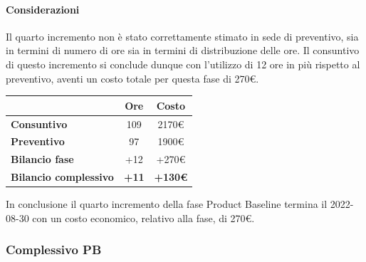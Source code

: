 \paragraph{Considerazioni} \hfill \break
Il quarto incremento non è stato correttamente stimato in sede di preventivo, sia in termini di numero di ore sia 
in termini di distribuzione delle ore. Il consuntivo di questo incremento si conclude dunque con l'utilizzo di 12 ore in più rispetto al preventivo, aventi un costo totale per questa fase di 270\euro.
\begin{center}
	\renewcommand{\arraystretch}{1.8}
	\begin{tabular}{ | l |c|c| }
    \hline
    & \textbf{Ore} & \textbf{Costo} \\
	\hline
    \textbf{Consuntivo} & 109 & 2170\euro \\
    \hline
    \textbf{Preventivo} & 97 & 1900\euro \\
    \hline
    \textbf{Bilancio fase} & +12 & +270\euro \\
    \hline
    \textbf{Bilancio complessivo} & \textbf{+11} & \textbf{+130\euro} \\
    \hline
    \end{tabular}
\end{center}
In conclusione il quarto incremento della fase Product Baseline termina il 2022-08-30 con un costo economico, relativo alla fase, di 270\euro.

\subsubsection{Complessivo PB}

